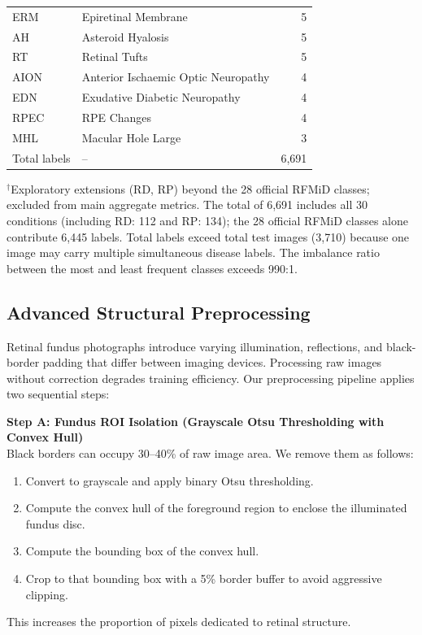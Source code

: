 \documentclass[conference]{IEEEtran}
\begin{document}
\begin{table}[htbp]
\begin{tabular}{llr}
ERM           & Epiretinal Membrane               &     5 \\
AH            & Asteroid Hyalosis                 &     5 \\
RT            & Retinal Tufts                     &     5 \\
AION          & Anterior Ischaemic Optic Neuropathy &   4 \\
EDN           & Exudative Diabetic Neuropathy     &     4 \\
RPEC          & RPE Changes                       &     4 \\
MHL           & Macular Hole Large                &     3 \\
\midrule
Total labels  & --                                & 6,691 \\
\bottomrule
\end{tabular}
\vspace{1pt}
\footnotesize{$^\dagger$Exploratory extensions (RD, RP) beyond the 28 official RFMiD classes; excluded from main aggregate metrics. The total of 6,691 includes all 30 conditions (including RD: 112 and RP: 134); the 28 official RFMiD classes alone contribute 6,445 labels. Total labels exceed total test images (3,710) because one image may carry multiple simultaneous disease labels. The imbalance ratio between the most and least frequent classes exceeds 990:1.}
\end{table}

\subsection{Advanced Structural Preprocessing}
Retinal fundus photographs introduce varying illumination, reflections, and black-border padding that differ between imaging devices. Processing raw images without correction degrades training efficiency. Our preprocessing pipeline applies two sequential steps:

\textbf{Step A: Fundus ROI Isolation (Grayscale Otsu Thresholding with Convex Hull)}\\
Black borders can occupy 30--40\% of raw image area. We remove them as follows:
\begin{enumerate}
    \item Convert to grayscale and apply binary Otsu thresholding.
    \item Compute the convex hull of the foreground region to enclose the illuminated fundus disc.
    \item Compute the bounding box of the convex hull.
    \item Crop to that bounding box with a 5\% border buffer to avoid aggressive clipping.
\end{enumerate}
This increases the proportion of pixels dedicated to retinal structure.
\end{document}
